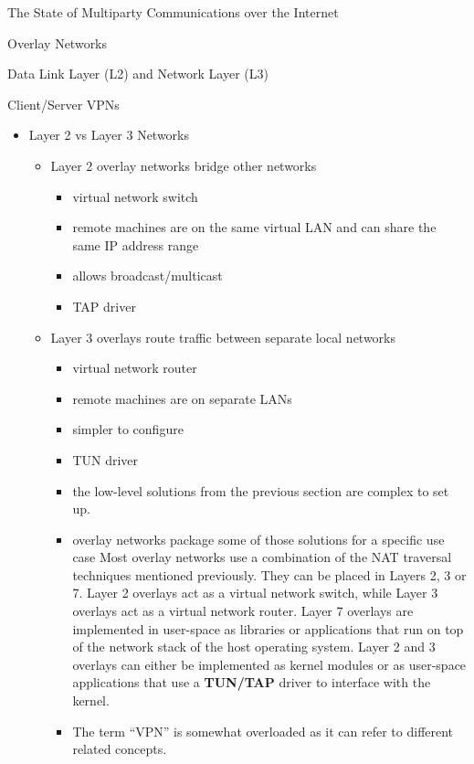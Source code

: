 \begin{frame}[fragile]{The State of Multiparty Communications over the
Internet}
\begin{block}{Overlay Networks}
\begin{block}{Data Link Layer (L2) and Network Layer (L3)}
\begin{block}{Client/Server VPNs}
\begin{itemize}
\tightlist
\item
  Layer 2 vs Layer 3 Networks

  \begin{itemize}
  \tightlist
  \item
    Layer 2 overlay networks bridge other networks

    \begin{itemize}
    \tightlist
    \item
      virtual network switch
    \item
      remote machines are on the same virtual LAN and can share the same
      IP address range
    \item
      allows broadcast/multicast
    \item
      TAP driver
    \end{itemize}
  \item
    Layer 3 overlays route traffic between separate local networks

    \begin{itemize}
    \item
      virtual network router
    \item
      remote machines are on separate LANs
    \item
      simpler to configure
    \item
      TUN driver
    \item
      the low-level solutions from the previous section are complex to
      set up.
    \item
      overlay networks package some of those solutions for a specific
      use case Most overlay networks use a combination of the NAT
      traversal techniques mentioned previously. They can be placed in
      Layers 2, 3 or 7. Layer 2 overlays act as a virtual network
      switch, while Layer 3 overlays act as a virtual network router.
      Layer 7 overlays are implemented in user-space as libraries or
      applications that run on top of the network stack of the host
      operating system. Layer 2 and 3 overlays can either be implemented
      as kernel modules or as user-space applications that use a
      \textbf{TUN/TAP}  driver to interface with
      the kernel.
    \end{itemize}


    \begin{itemize}
    \tightlist
    \item
      The term ``VPN'' is somewhat overloaded as it can refer to
      different related concepts.
    \end{itemize}


\end{itemize}
\end{itemize}
\end{block}
\end{block}
\end{block}
\end{frame}
